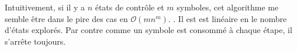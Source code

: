 Intuitivement, si il y a $n$ états de contrôle et $m$ symboles, cet algorithme me semble être dans le pire des cas en $\mathcal{O}(mn^m)$. . Il est est linéaire en le nombre d'états explorés.
Par contre comme un symbole est consommé à chaque étape, il s'arrête toujours.
